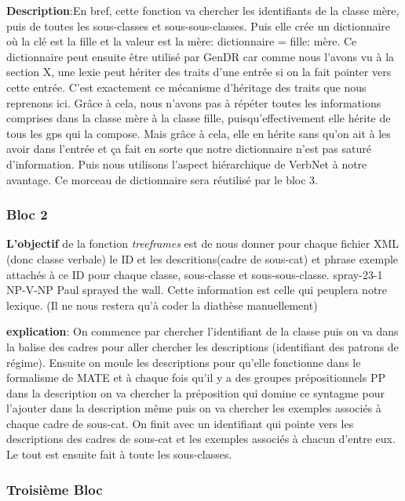 \textbf{Description}:En bref, cette fonction va chercher les identifiants de la classe mère, puis de toutes les sous-classes et sous-sous-classes. Puis elle crée un dictionnaire où la clé est la fille et la valeur est la mère: dictionnaire = {fille: mère}. Ce dictionnaire peut ensuite être utilisé par GenDR car comme nous l'avons vu à la section X, une lexie peut hériter des traits d'une entrée si on la fait pointer vers cette entrée. C'est exactement ce mécanisme d'héritage des traits que nous reprenons ici. Grâce à cela, nous n'avons pas à répéter toutes les informations comprises dans la classe mère à la classe fille, puisqu'effectivement elle hérite de tous les gps qui la compose. Mais grâce à cela, elle en hérite sans qu'on ait à les avoir dans l'entrée et ça fait en sorte que notre dictionnaire n'est pas saturé d'information. Puis nous utilisons l'aspect hiérarchique de VerbNet à notre avantage. Ce morceau de dictionnaire sera réutilisé par le bloc 3.

\subsubsection{Bloc 2}
\textbf{L'objectif} de la fonction \emph{treeframes} est de nous donner pour chaque fichier XML (donc classe verbale) le ID et les descritions(cadre de sous-cat) et phrase exemple attachés à ce ID pour chaque classe, sous-classe et sous-sous-classe. spray-23-1 NP-V-NP Paul sprayed the wall. Cette information est celle qui peuplera notre lexique. (Il ne nous restera qu'à coder la diathèse manuellement)

\textbf{explication}: On commence par chercher l'identifiant de la classe puis on va dans la balise des cadres pour aller chercher les descriptions (identifiant des patrons de régime). Ensuite on moule les descriptions pour qu'elle fonctionne dans le formalisme de MATE et à chaque fois qu'il y a des groupes prépositionnels PP dans la description on va chercher la préposition qui domine ce syntagme pour l'ajouter dans la description même  puis on va chercher les exemples associés à chaque cadre de sous-cat. On finit avec un identifiant qui pointe vers les descriptions des cadres de sous-cat et les exemples associés à chacun d'entre eux. Le tout est ensuite fait à toute les sous-classes.

\subsubsection{Troisième Bloc}

